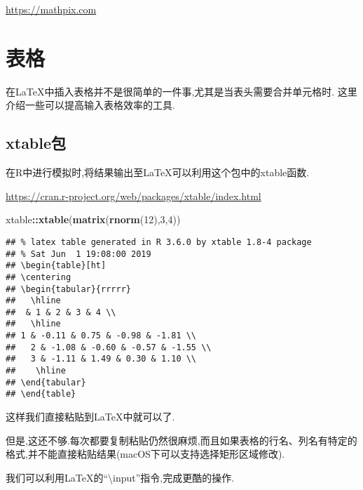 \documentclass[]{ctexbook}
\newenvironment{Shaded}{\begin{snugshade}}{\end{snugshade}}
\newcommand{\DecValTok}[1]{\textcolor[rgb]{0.00,0.00,0.81}{#1}}
\newcommand{\KeywordTok}[1]{\textcolor[rgb]{0.13,0.29,0.53}{\textbf{#1}}}
\newcommand{\NormalTok}[1]{#1}
\newcommand{\OperatorTok}[1]{\textcolor[rgb]{0.81,0.36,0.00}{\textbf{#1}}}
\begin{document}
\url{https://mathpix.com}

\hypertarget{section-19}{%
\section{表格}\label{section-19}}

在LaTeX中插入表格并不是很简单的一件事,尤其是当表头需要合并单元格时.
这里介绍一些可以提高输入表格效率的工具.

\hypertarget{xtable}{%
\subsection{xtable包}\label{xtable}}

在R中进行模拟时,将结果输出至LaTeX可以利用这个包中的xtable函数.

\url{https://cran.r-project.org/web/packages/xtable/index.html}

\begin{Shaded}
\begin{Highlighting}[]
\NormalTok{xtable}\OperatorTok{::}\KeywordTok{xtable}\NormalTok{(}\KeywordTok{matrix}\NormalTok{(}\KeywordTok{rnorm}\NormalTok{(}\DecValTok{12}\NormalTok{),}\DecValTok{3}\NormalTok{,}\DecValTok{4}\NormalTok{))}
\end{Highlighting}
\end{Shaded}

\begin{verbatim}
## % latex table generated in R 3.6.0 by xtable 1.8-4 package
## % Sat Jun  1 19:08:00 2019
## \begin{table}[ht]
## \centering
## \begin{tabular}{rrrrr}
##   \hline
##  & 1 & 2 & 3 & 4 \\ 
##   \hline
## 1 & -0.11 & 0.75 & -0.98 & -1.81 \\ 
##   2 & -1.08 & -0.60 & -0.57 & -1.55 \\ 
##   3 & -1.11 & 1.49 & 0.30 & 1.10 \\ 
##    \hline
## \end{tabular}
## \end{table}
\end{verbatim}

这样我们直接粘贴到LaTeX中就可以了.

但是,这还不够.每次都要复制粘贴仍然很麻烦,而且如果表格的行名、列名有特定的格式,并不能直接粘贴结果(macOS下可以支持选择矩形区域修改).

我们可以利用LaTeX的``\textbackslash{}input''指令,完成更酷的操作.
\end{document}
